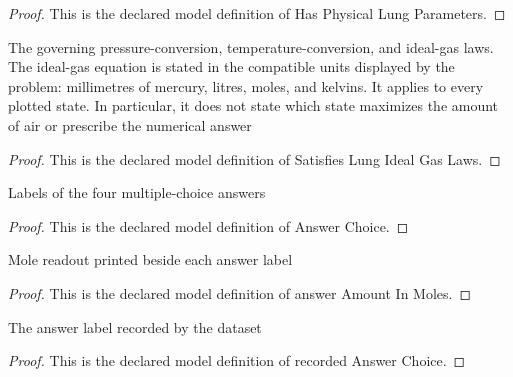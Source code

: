 \begin{proof}
  This is the declared model definition of Has Physical Lung Parameters.
\end{proof}
\begin{definition}
  \label{def:physics:phyx-mini-0336:phyxminiproblems-problemphyxmini0336-satisfieslungidealgaslaws}
  The governing pressure-conversion, temperature-conversion, and ideal-gas laws. The ideal-gas equation is stated in the compatible units displayed by the problem: millimetres of mercury, litres, moles, and kelvins. It applies to every plotted state. In particular, it does not state which state maximizes the amount of air or prescribe the numerical answer
\end{definition}
\begin{proof}
  This is the declared model definition of Satisfies Lung Ideal Gas Laws.
\end{proof}
\begin{definition}
  \label{def:physics:phyx-mini-0336:phyxminiproblems-problemphyxmini0336-answerchoice}
  Labels of the four multiple-choice answers
\end{definition}
\begin{proof}
  This is the declared model definition of Answer Choice.
\end{proof}
\begin{definition}
  \label{def:physics:phyx-mini-0336:phyxminiproblems-problemphyxmini0336-answeramountinmoles}
  Mole readout printed beside each answer label
\end{definition}
\begin{proof}
  This is the declared model definition of answer Amount In Moles.
\end{proof}
\begin{definition}
  \label{def:physics:phyx-mini-0336:phyxminiproblems-problemphyxmini0336-recordedanswerchoice}
  The answer label recorded by the dataset
\end{definition}
\begin{proof}
  This is the declared model definition of recorded Answer Choice.
\end{proof}
